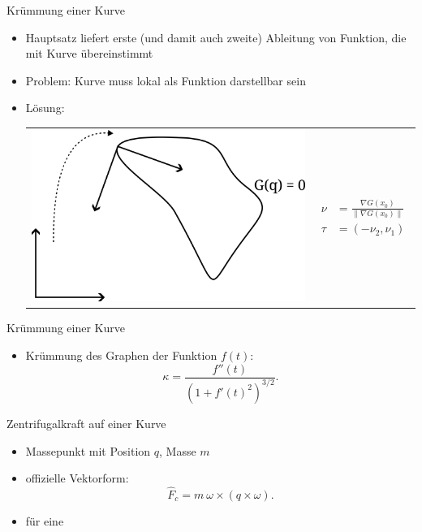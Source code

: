 \documentclass[aspectratio=169]{beamer}
\begin{document}
\begin{frame}{Krümmung einer Kurve}
\begin{itemize}[<+->]
    \item Hauptsatz liefert erste (und damit auch zweite) Ableitung von Funktion,
        die mit Kurve übereinstimmt
    \item Problem: Kurve muss lokal als Funktion darstellbar sein
    \item Lösung:

    \begin{tabular}[t]{l c}
    \includegraphics[scale=0.7]{./trafo.png} &
    {$\!\begin{aligned} %
        \nu &= \frac{ \nabla G(x_0) }{ \| \nabla G(x_0) \| } \\
        \tau &= (-\nu_2, \nu_1)
        \end{aligned}$}
    \end{tabular}
\end{itemize}
\end{frame}

\begin{frame}{Krümmung einer Kurve}
\begin{itemize}
    \item Krümmung des Graphen der Funktion $f(t)$:
        \begin{equation*}
        \kappa = \frac{f''(t)}{(1 + f'(t)^2)^{3/2}}.
        \end{equation*}
\end{itemize}
\end{frame}

\begin{frame}{Zentrifugalkraft auf einer Kurve}
\begin{itemize}
    \item Massepunkt mit Position $q$, Masse $m$
    \item offizielle Vektorform:
        $$
        \hat{F}_c = m ~ \omega \times (q \times \omega).
        $$
    \item für eine
\end{itemize}
\end{frame}
\end{document}
